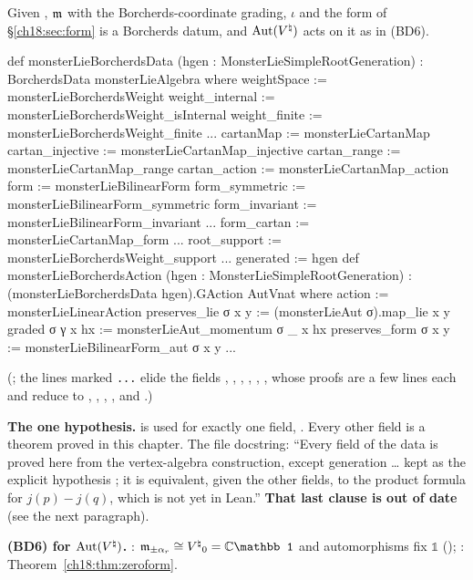 \begin{theorem}\label{ch18:thm:monsterbd}
Given , $\mathfrak{m}$ with the Borcherds-coordinate grading, $\iota$ and the form of
\S\ref{ch18:sec:form} is a Borcherds datum, and $\operatorname{Aut}({V^{\natural}})$ acts on it as in (BD6).
\end{theorem}
\begin{leancode}
def monsterLieBorcherdsData (hgen : MonsterLieSimpleRootGeneration) :
    BorcherdsData monsterLieAlgebra where
  weightSpace := monsterLieBorcherdsWeight
  weight_internal := monsterLieBorcherdsWeight_isInternal
  weight_finite := monsterLieBorcherdsWeight_finite
  ...
  cartanMap := monsterLieCartanMap
  cartan_injective := monsterLieCartanMap_injective
  cartan_range := monsterLieCartanMap_range
  cartan_action := monsterLieCartanMap_action
  form := monsterLieBilinearForm
  form_symmetric := monsterLieBilinearForm_symmetric
  form_invariant := monsterLieBilinearForm_invariant
  ...
  form_cartan := monsterLieCartanMap_form
  ...
  root_support := monsterLieBorcherdsWeight_support
  ...
  generated := hgen
def monsterLieBorcherdsAction (hgen : MonsterLieSimpleRootGeneration) :
    (monsterLieBorcherdsData hgen).GAction AutVnat where
  action := monsterLieLinearAction
  preserves_lie σ x y := (monsterLieAut σ).map_lie x y
  graded σ γ x hx := monsterLieAut_momentum σ _ x hx
  preserves_form σ x y := monsterLieBilinearForm_aut σ x y
  ...
\end{leancode}
(; the lines marked \texttt{...} elide the fields , ,
, , , , whose proofs are a few
lines each and reduce to , ,
, ,
 and .)
\begin{dictionary}
\textbf{The one hypothesis.}   is used for exactly one field, .  Every other field
is a theorem proved in this chapter.  The file docstring: ``Every field of the data is proved here from the
vertex-algebra construction, except generation \dots{} kept as the explicit hypothesis
; it is equivalent, given the other fields, to the product formula for
$j(p)-j(q)$, which is not yet in Lean.''  \textbf{That last clause is out of date} (see the next paragraph).

\textbf{(BD6) for $\operatorname{Aut}({V^{\natural}})$.}  : $\chXVIIIm_{\pm\alpha_r}\cong\Vnat_0=\mathbb C\mathbb 1$ and automorphisms fix $\mathbb 1$
(); : Theorem~\ref{ch18:thm:zeroform}.
\end{dictionary}

